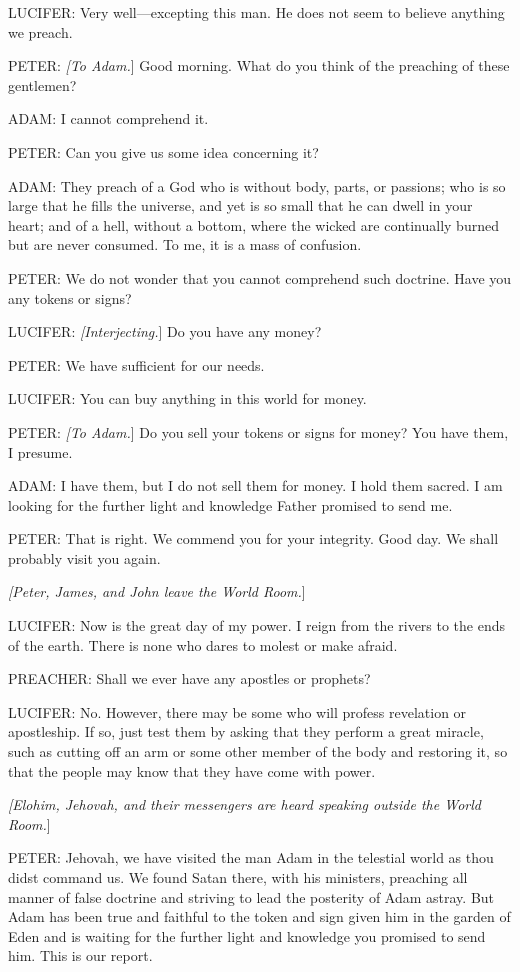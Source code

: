 			LUCIFER: Very well---excepting this man. He does not seem to believe anything we preach.

			PETER: \textit{[To Adam.}] Good morning. What do you think of the preaching of these gentlemen?

			ADAM: I cannot comprehend it.

			PETER: Can you give us some idea concerning it?

			ADAM: They preach of a God who is without body, parts, or passions; who is so large that he fills the universe, and yet is so small that he can dwell in your heart; and of a hell, without a bottom, where the wicked are continually burned but are never consumed. To me, it is a mass of confusion.

			PETER: We do not wonder that you cannot comprehend such doctrine. Have you any tokens or signs?

			LUCIFER: \textit{[Interjecting.}] Do you have any money?

			PETER: We have sufficient for our needs.

			LUCIFER: You can buy anything in this world for money.

			PETER: \textit{[To Adam.}] Do you sell your tokens or signs for money? You have them, I presume.

			ADAM: I have them, but I do not sell them for money. I hold them sacred. I am looking for the further light and knowledge Father promised to send me.

			PETER: That is right. We commend you for your integrity. Good day. We shall probably visit you again.

			\textit{[Peter, James, and John leave the World Room.}]
			
			LUCIFER: Now is the great day of my power. I reign from the rivers to the ends of the earth. There is none who dares to molest or make afraid.

			PREACHER: Shall we ever have any apostles or prophets?

			LUCIFER: No. However, there may be some who will profess revelation or apostleship. If so, just test them by asking that they perform a great miracle, such as cutting off an arm or some other member of the body and restoring it, so that the people may know that they have come with power.
			
			\textit{[Elohim, Jehovah, and their messengers are heard speaking outside the World Room.}]

			PETER: Jehovah, we have visited the man Adam in the telestial world as thou didst command us. We found Satan there, with his ministers, preaching all manner of false doctrine and striving to lead the posterity of Adam astray. But Adam has been true and faithful to the token and sign given him in the garden of Eden and is waiting for the further light and knowledge you promised to send him. This is our report.

